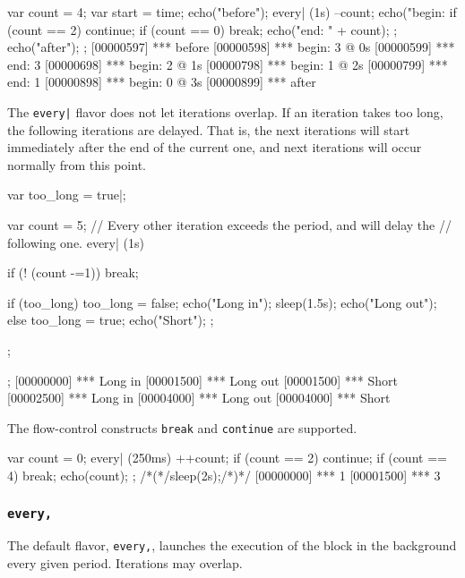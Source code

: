 \begin{urbiscript}
{
  var count = 4;
  var start = time;
  echo("before");
  every| (1s)
  {
    --count;
    echo("begin: %
    if (count == 2)
      continue;
    if (count == 0)
      break;
    echo("end:   " + count);
  };
  echo("after");
};
[00000597] *** before
[00000598] *** begin: 3 @ 0s
[00000599] *** end:   3
[00000698] *** begin: 2 @ 1s
[00000798] *** begin: 1 @ 2s
[00000799] *** end:   1
[00000898] *** begin: 0 @ 3s
[00000899] *** after
\end{urbiscript}

The \lstinline{every|} flavor does not let iterations overlap. If an
iteration takes too long, the following iterations are delayed. That
is, the next iterations will start immediately after the end of the
current one, and next iterations will occur normally from this point.

\begin{urbiscript}
{
  var too_long = true|;

  var count = 5;
  // Every other iteration exceeds the period, and will delay the
  // following one.
  every| (1s)
  {
    if (! (count -=1))
      break;

    if (too_long)
    {
      too_long = false;
      echo("Long in");
      sleep(1.5s);
      echo("Long out");
    }
    else
    {
      too_long = true;
      echo("Short");
    };
  };
};
[00000000] *** Long in
[00001500] *** Long out
[00001500] *** Short
[00002500] *** Long in
[00004000] *** Long out
[00004000] *** Short
\end{urbiscript}

The flow-control constructs \lstinline|break| and \lstinline|continue|
are supported.

\begin{urbiscript}
{
  var count = 0;
  every| (250ms)
  {
    ++count;
    if (count == 2)
      continue;
    if (count == 4)
      break;
    echo(count);
  }
};
/*(*/sleep(2s);/*)*/
[00000000] *** 1
[00001500] *** 3
\end{urbiscript}



\subsubsection{\lstinline'every,'}
The default flavor, \lstinline|every,|, launches the execution of the
block in the background every given period. Iterations may overlap.

